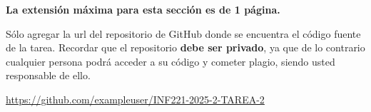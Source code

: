 \begin{mdframed}
    \textbf{La extensión máxima para esta sección es de 1 página.}
\end{mdframed}


Sólo agregar la url del repositorio de GitHub donde se encuentra el código fuente de la tarea. Recordar que el repositorio \textbf{debe ser privado}, ya que de lo contrario cualquier persona podrá acceder a su código y cometer plagio, siendo usted responsable de ello. 

\begin{mdframed}
    \begin{center}
        {\Large \url{https://github.com/exampleuser/INF221-2025-2-TAREA-2}}
    \end{center}
\end{mdframed}


